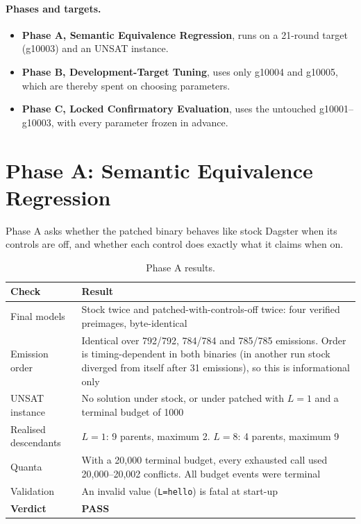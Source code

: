 \documentclass[11pt,a4paper]{article}
\begin{document}
\paragraph{Phases and targets.}
\begin{itemize}
\item \textbf{Phase A, Semantic Equivalence Regression}, runs on a 21-round target (g10003) and an
UNSAT instance.
\item \textbf{Phase B, Development-Target Tuning}, uses only g10004 and g10005, which are thereby spent
on choosing parameters.
\item \textbf{Phase C, Locked Confirmatory Evaluation}, uses the untouched g10001--g10003, with every
parameter frozen in advance.
\end{itemize}

\section{Phase A: Semantic Equivalence Regression}

Phase A asks whether the patched binary behaves like stock Dagster when its controls are off, and
whether each control does exactly what it claims when on.

\begin{table}[h]\centering\small
\begin{tabularx}{\textwidth}{@{}lL@{}}
\toprule
\textbf{Check} & \textbf{Result}\\
\midrule
Final models & Stock twice and patched-with-controls-off twice: four verified preimages, byte-identical\\
Emission order & Identical over 792/792, 784/784 and 785/785 emissions. Order is timing-dependent in
both binaries (in another run stock diverged from itself after 31 emissions), so this is
informational only\\
UNSAT instance & No solution under stock, or under patched with $L=1$ and a terminal budget of 1000\\
Realised descendants & $L=1$: 9 parents, maximum 2. $L=8$: 4 parents, maximum 9\\
Quanta & With a 20{,}000 terminal budget, every exhausted call used 20{,}000--20{,}002 conflicts.
All budget events were terminal\\
Validation & An invalid value (\texttt{L=hello}) is fatal at start-up\\
\textbf{Verdict} & \textbf{PASS}\\
\bottomrule
\end{tabularx}
\caption{Phase A results.}
\end{table}
\end{document}
